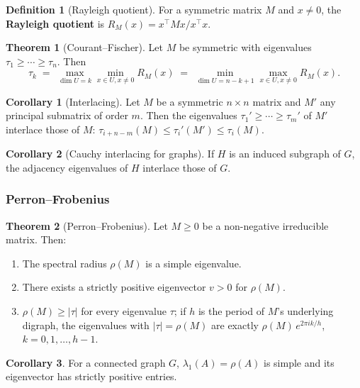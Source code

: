 \documentclass{article}
\theoremstyle{definition}
\newtheorem{theorem}{Theorem}
\newtheorem{corollary}{Corollary}
\newtheorem{definition}{Definition}
\begin{document}
\begin{definition}[Rayleigh quotient]
For a symmetric matrix $M$ and $x \ne 0$, the \textbf{Rayleigh
quotient} is $R_M(x) = x^\top M x / x^\top x$.
\end{definition}

\begin{theorem}[Courant--Fischer]\label{thm:courantfischer}
Let $M$ be symmetric with eigenvalues $\tau_1 \ge \cdots \ge \tau_n$.
Then
\[
  \tau_k \;=\; \max_{\dim U = k} \min_{x \in U, x \ne 0} R_M(x)
          \;=\; \min_{\dim U = n - k + 1} \max_{x \in U, x \ne 0} R_M(x).
\]
\end{theorem}

\begin{corollary}[Interlacing]
Let $M$ be a symmetric $n \times n$ matrix and $M'$ any principal
submatrix of order $m$. Then the eigenvalues
$\tau_1' \ge \cdots \ge \tau_m'$ of $M'$ interlace those of $M$:
$\tau_{i + n - m}(M) \le \tau_i'(M') \le \tau_i(M)$.
\end{corollary}

\begin{corollary}[Cauchy interlacing for graphs]
If $H$ is an induced subgraph of $G$, the adjacency eigenvalues of
$H$ interlace those of $G$.
\end{corollary}

\subsubsection{Perron--Frobenius}

\begin{theorem}[Perron--Frobenius]\label{thm:perron}
Let $M \ge 0$ be a non-negative irreducible matrix. Then:
\begin{enumerate}
  \item The spectral radius $\rho(M)$ is a simple eigenvalue.
  \item There exists a strictly positive eigenvector $v > 0$ for
        $\rho(M)$.
  \item $\rho(M) \ge |\tau|$ for every eigenvalue $\tau$; if $h$ is the
        period of $M$'s underlying digraph, the eigenvalues with
        $|\tau| = \rho(M)$ are exactly $\rho(M)\, e^{2\pi i k/h}$,
        $k = 0, 1, \dots, h - 1$.
\end{enumerate}
\end{theorem}

\begin{corollary}
For a connected graph $G$, $\lambda_1(A) = \rho(A)$ is simple and its
eigenvector has strictly positive entries.
\end{corollary}
\end{document}
